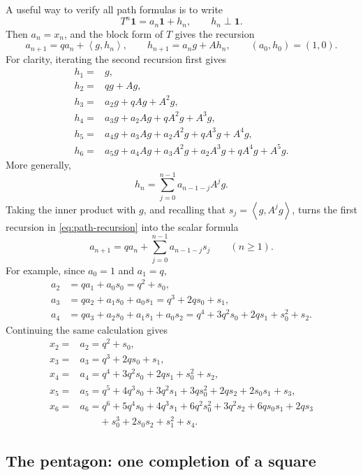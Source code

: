 \documentclass[11pt]{article}
\newcommand{\one}{\mathbf 1}
\newcommand{\ip}[2]{\left\langle #1,#2\right\rangle}
\begin{document}
A useful way to verify all path formulas is to write
\[
       T^n\one=a_n\one+h_n,\qquad h_n\perp\one.
\]
Then \(a_n=x_n\), and the block form of \(T\) gives the recursion
\begin{equation}\label{eq:path-recursion}
       a_{n+1}=qa_n+\ip g{h_n},
       \qquad h_{n+1}=a_ng+Ah_n,
       \qquad (a_0,h_0)=(1,0).
\end{equation}
For clarity, iterating the second recursion first gives
\[
\begin{aligned}
 h_1={}&g,\\
 h_2={}&qg+Ag,\\
 h_3={}&a_2g+qAg+A^2g,\\
 h_4={}&a_3g+a_2Ag+qA^2g+A^3g,\\
 h_5={}&a_4g+a_3Ag+a_2A^2g+qA^3g+A^4g,\\
 h_6={}&a_5g+a_4Ag+a_3A^2g+a_2A^3g
          +qA^4g+A^5g.
\end{aligned}
\]
More generally,
\[
       h_n=\sum_{j=0}^{n-1}a_{n-1-j}A^jg.
\]
Taking the inner product with \(g\), and recalling that
\(s_j=\ip g{A^jg}\), turns the first recursion in
\eqref{eq:path-recursion} into the scalar formula
\begin{equation}\label{eq:path-scalar-recursion}
       a_{n+1}=qa_n+\sum_{j=0}^{n-1}a_{n-1-j}s_j
       \qquad(n\ge1).
\end{equation}
For example, since \(a_0=1\) and \(a_1=q\),
\[
\begin{aligned}
 a_2&=qa_1+a_0s_0=q^2+s_0,\\
 a_3&=qa_2+a_1s_0+a_0s_1=q^3+2qs_0+s_1,\\
 a_4&=qa_3+a_2s_0+a_1s_1+a_0s_2
      =q^4+3q^2s_0+2qs_1+s_0^2+s_2.
\end{aligned}
\]
Continuing the same calculation gives
\begin{equation}\label{eq:path-2-6}
\begin{aligned}
 x_2={}&a_2 = q^2+s_0,\\
 x_3={}&a_3 = q^3+2qs_0+s_1,\\
 x_4={}&a_4 = q^4+3q^2s_0+2qs_1+s_0^2+s_2,\\
 x_5={}&a_5 = q^5+4q^3s_0+3q^2s_1+3qs_0^2+2qs_2+2s_0s_1+s_3,\\
 x_6={}&a_6 = q^6+5q^4s_0+4q^3s_1+6q^2s_0^2+3q^2s_2
       +6qs_0s_1+2qs_3\\
     &\qquad{}+s_0^3+2s_0s_2+s_1^2+s_4.
\end{aligned}
\end{equation}

\subsection{The pentagon: one completion of a square}\label{subsec:C5}
\end{document}
